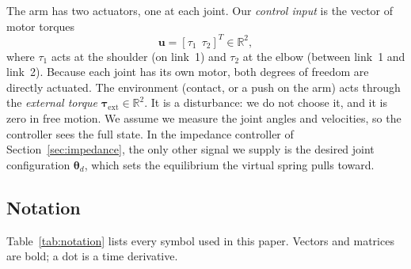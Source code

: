 \documentclass[letterpaper, 10pt, conference]{ieeeconf}
\begin{document}
The arm has two actuators, one at each joint. Our
\emph{control input} is the vector of motor torques
\[
\mathbf{u}=[\tau_1\ \ \tau_2]^{T}\in\mathbb{R}^{2},
\]
where $\tau_1$ acts at the shoulder (on link~1) and
$\tau_2$ at the elbow (between link~1 and link~2).
Because each joint has its own motor, both degrees of
freedom are directly actuated. The environment
(contact, or a push on the arm) acts through the
\emph{external torque}
$\boldsymbol{\tau}_{\mathrm{ext}}\in\mathbb{R}^{2}$.
It is a disturbance: we do not choose it, and it is
zero in free motion. We assume we measure the joint
angles and velocities, so the controller sees the full
state. In the impedance controller of
Section~\ref{sec:impedance}, the only other signal we
supply is the desired joint configuration
$\boldsymbol{\theta}_d$, which sets the equilibrium
the virtual spring pulls toward.

\subsection{Notation}

Table~\ref{tab:notation} lists every symbol used in
this paper. Vectors and matrices are bold; a dot is
a time derivative.
\end{document}
